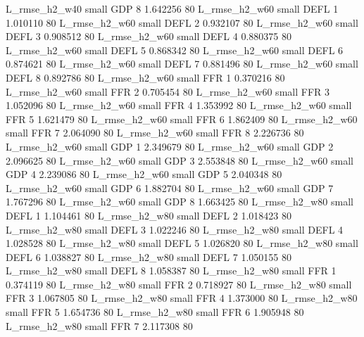  L_rmse_h2_w40      small      GDP                 8 1.642256 80
 L_rmse_h2_w60      small     DEFL                 1 1.010110 80
 L_rmse_h2_w60      small     DEFL                 2 0.932107 80
 L_rmse_h2_w60      small     DEFL                 3 0.908512 80
 L_rmse_h2_w60      small     DEFL                 4 0.880375 80
 L_rmse_h2_w60      small     DEFL                 5 0.868342 80
 L_rmse_h2_w60      small     DEFL                 6 0.874621 80
 L_rmse_h2_w60      small     DEFL                 7 0.881496 80
 L_rmse_h2_w60      small     DEFL                 8 0.892786 80
 L_rmse_h2_w60      small      FFR                 1 0.370216 80
 L_rmse_h2_w60      small      FFR                 2 0.705454 80
 L_rmse_h2_w60      small      FFR                 3 1.052096 80
 L_rmse_h2_w60      small      FFR                 4 1.353992 80
 L_rmse_h2_w60      small      FFR                 5 1.621479 80
 L_rmse_h2_w60      small      FFR                 6 1.862409 80
 L_rmse_h2_w60      small      FFR                 7 2.064090 80
 L_rmse_h2_w60      small      FFR                 8 2.226736 80
 L_rmse_h2_w60      small      GDP                 1 2.349679 80
 L_rmse_h2_w60      small      GDP                 2 2.096625 80
 L_rmse_h2_w60      small      GDP                 3 2.553848 80
 L_rmse_h2_w60      small      GDP                 4 2.239086 80
 L_rmse_h2_w60      small      GDP                 5 2.040348 80
 L_rmse_h2_w60      small      GDP                 6 1.882704 80
 L_rmse_h2_w60      small      GDP                 7 1.767296 80
 L_rmse_h2_w60      small      GDP                 8 1.663425 80
 L_rmse_h2_w80      small     DEFL                 1 1.104461 80
 L_rmse_h2_w80      small     DEFL                 2 1.018423 80
 L_rmse_h2_w80      small     DEFL                 3 1.022246 80
 L_rmse_h2_w80      small     DEFL                 4 1.028528 80
 L_rmse_h2_w80      small     DEFL                 5 1.026820 80
 L_rmse_h2_w80      small     DEFL                 6 1.038827 80
 L_rmse_h2_w80      small     DEFL                 7 1.050155 80
 L_rmse_h2_w80      small     DEFL                 8 1.058387 80
 L_rmse_h2_w80      small      FFR                 1 0.374119 80
 L_rmse_h2_w80      small      FFR                 2 0.718927 80
 L_rmse_h2_w80      small      FFR                 3 1.067805 80
 L_rmse_h2_w80      small      FFR                 4 1.373000 80
 L_rmse_h2_w80      small      FFR                 5 1.654736 80
 L_rmse_h2_w80      small      FFR                 6 1.905948 80
 L_rmse_h2_w80      small      FFR                 7 2.117308 80
